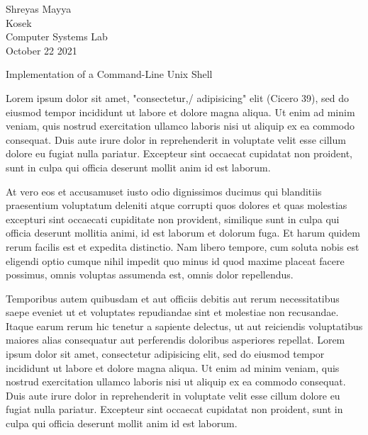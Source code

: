 \documentclass[12pt]{article}
\begin{document}
		\begin{flushleft}
			
			Shreyas Mayya\\
			Kosek\\
			Computer Systems Lab\\
			October 22 2021\\
			
			
			\begin{center}
				Implementation of a Command-Line Unix Shell
			\end{center}
			
			
			\setlength{\parindent}{0.5in}
			
			Lorem ipsum dolor sit amet, "consectetur,/ adipisicing" elit (Cicero 39), sed do eiusmod tempor incididunt ut labore et dolore magna aliqua. Ut enim ad minim veniam, quis nostrud exercitation ullamco laboris nisi ut aliquip ex ea commodo consequat. Duis aute irure dolor in reprehenderit in voluptate velit esse cillum dolore eu fugiat nulla pariatur. Excepteur sint occaecat cupidatat non proident, sunt in culpa qui officia deserunt mollit anim id est laborum.
			
			At vero eos et accusamus\footnotemark  et iusto odio dignissimos ducimus qui blanditiis praesentium voluptatum deleniti atque corrupti quos dolores et quas molestias excepturi sint occaecati cupiditate non provident, similique sunt in culpa qui officia deserunt mollitia animi, id est laborum et dolorum fuga. Et harum quidem rerum facilis est et expedita distinctio. Nam libero tempore, cum soluta nobis est eligendi optio cumque nihil impedit quo minus id quod maxime placeat facere possimus, omnis voluptas assumenda est, omnis dolor repellendus. 
			
			Temporibus autem quibusdam et aut officiis debitis aut rerum necessitatibus saepe eveniet ut et voluptates repudiandae sint et molestiae non recusandae. Itaque earum rerum hic tenetur a sapiente delectus, ut aut reiciendis voluptatibus maiores alias consequatur aut perferendis doloribus asperiores repellat. Lorem ipsum dolor sit amet, consectetur adipisicing elit, sed do eiusmod tempor incididunt ut labore et dolore magna aliqua. Ut enim ad minim veniam, quis nostrud exercitation ullamco laboris nisi ut aliquip ex ea commodo consequat. Duis aute irure dolor in reprehenderit in voluptate velit esse cillum dolore eu fugiat nulla pariatur. Excepteur sint occaecat cupidatat non proident, sunt in culpa qui officia deserunt mollit anim id est laborum.
			

\end{flushleft}
\end{document}
